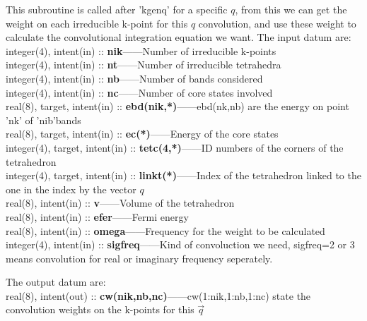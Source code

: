 \documentclass[10pt]{article}
\begin{document}
This subroutine is called after 'kgenq' for a specific $q$, from this we can get the weight on each irreducible k-point for this $q$ convolution, and use these weight to calculate the convolutional integration equation we want.  The input datum are:\\

integer(4), intent(in) :: \textbf{nik}------Number of irreducible k-points\\

integer(4), intent(in) :: \textbf{nt}------Number of irreducible tetrahedra\\

integer(4), intent(in) :: \textbf{nb}------Number of bands considered\\
      
integer(4), intent(in) :: \textbf{nc}------Number of core states involved\\
      
real(8), target, intent(in) :: \textbf{ebd(nik,*)}------ebd(nk,nb) are the energy on point 'nk' of 'nib'bands\\

real(8), target, intent(in) :: \textbf{ec(*)}------Energy of the core states\\
      
integer(4), target, intent(in) :: \textbf{tetc(4,*)}------ID numbers of the corners of the tetrahedron\\
      
integer(4), target, intent(in) :: \textbf{linkt(*)}------Index of the tetrahedron linked to the one in the index by the vector $q$\\

real(8), intent(in) :: \textbf{v}------Volume of the tetrahedron\\

real(8), intent(in) :: \textbf{efer}------Fermi energy\\

real(8), intent(in) :: \textbf{omega}------Frequency for the weight to be calculated\\
      
integer(4), intent(in) :: \textbf{sigfreq}------Kind of convoluction we need, sigfreq=2 or 3 means convolution for real or imaginary frequency seperately.

The output datum are:\\

real(8), intent(out) :: \textbf{cw(nik,nb,nc)}------cw(1:nik,1:nb,1:nc) state the convolution weights on the k-points for this $\vec{q}$\\
\end{document}
